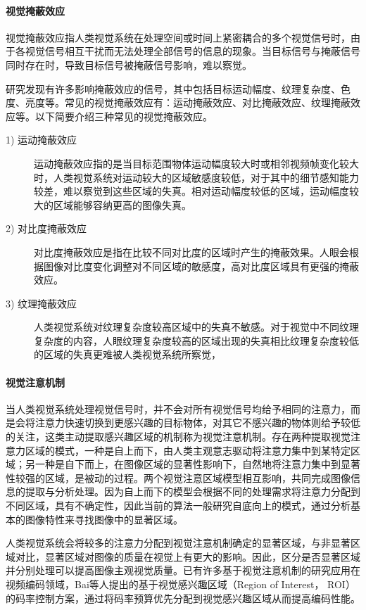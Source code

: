   \paragraph{视觉掩蔽效应} 视觉掩蔽效应指人类视觉系统在处理空间或时间上紧密耦合的多个视觉信号时，由于各视觉信号相互干扰而无法处理全部信号的信息的现象。当目标信号与掩蔽信号同时存在时，导致目标信号被掩蔽信号影响，难以察觉。

  研究发现有许多影响掩蔽效应的信号，其中包括目标运动幅度、纹理复杂度、色度、亮度等。常见的视觉掩蔽效应有：运动掩蔽效应、对比掩蔽效应、纹理掩蔽效应等。以下简要介绍三种常见的视觉掩蔽效应。
  \begin{description}
    \item [1) 运动掩蔽效应]
    运动掩蔽效应指的是当目标范围物体运动幅度较大时或相邻视频帧变化较大时，人类视觉系统对运动较大的区域敏感度较低，对于其中的细节感知能力较差，难以察觉到这些区域的失真。相对运动幅度较低的区域，运动幅度较大的区域能够容纳更高的图像失真。
    \item [2) 对比度掩蔽效应]
    对比度掩蔽效应是指在比较不同对比度的区域时产生的掩蔽效果。人眼会根据图像对比度变化调整对不同区域的敏感度，高对比度区域具有更强的掩蔽效应。
    \item [3) 纹理掩蔽效应]
    人类视觉系统对纹理复杂度较高区域中的失真不敏感。对于视觉中不同纹理复杂度的内容，人眼纹理复杂度较高的区域出现的失真相比纹理复杂度较低的区域的失真更难被人类视觉系统所察觉，
  \end{description}

  \paragraph{视觉注意机制} 当人类视觉系统处理视觉信号时，并不会对所有视觉信号均给予相同的注意力，而是会将注意力快速切换到更感兴趣的目标物体，对其它不感兴趣的物体则给予较低的关注，这类主动提取感兴趣区域的机制称为视觉注意机制\cite{borjiStateoftheArtVisualAttention2013}。存在两种提取视觉注意力区域的模式，一种是自上而下，由人类主观意志驱动将注意力集中到某特定区域；另一种是自下而上，在图像区域的显著性影响下，自然地将注意力集中到显著性较强的区域，是被动的过程。两个视觉注意区域模型相互影响，共同完成图像信息的提取与分析处理。因为自上而下的模型会根据不同的处理需求将注意力分配到不同区域，具有不确定性，因此当前的算法一般研究自底向上的模式，通过分析基本的图像特性来寻找图像中的显著区域。

  人类视觉系统会将较多的注意力分配到视觉注意机制确定的显著区域，与非显著区域对比，显著区域对图像的质量在视觉上有更大的影响。因此，区分是否显著区域并分别处理可以提高图像主观视觉质量。已有许多基于视觉注意机制的研究应用在视频编码领域，Bai等人提出的基于视觉感兴趣区域（Region of Interest， ROI）的码率控制方案\cite{baiSaliencyBasedRate2016}，通过将码率预算优先分配到视觉感兴趣区域从而提高编码性能。


